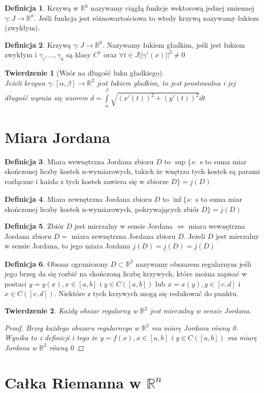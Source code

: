 \documentclass[12pt,a4paper]{article}
\newtheorem{tw}{Twierdzenie}
\theoremstyle{definition}
\newtheorem{df}{Definicja}
\begin{document}
\begin{df}
Krzywą w $\mathbb{R}^k$ nazywamy ciągłą funkcje wektorową jednej zmiennej $\gamma: J\to\mathbb{R}^k$. Jeśli funkcja jest różnowartościowa to wtedy krzywą nazywamy łukiem (zwykłym).
\end{df}
\begin{df}
Krzywą $\gamma: J\to\mathbb{R}^k$. Nazywamy łukiem gładkim, jeśli jest łukiem zwykłym i $\gamma_i, \dots ,\gamma_k$ są klasy $C^1$ oraz $\forall t\in J ||\gamma '(x)||^2 \neq 0$
\end{df}

\begin{tw}[Wzór na długość łuku gładkiego]~\\
Jeżeli krzywa $\gamma :[\alpha , \beta ] \to\mathbb{R}^2$ jest łukiem gładkim, to jest prostowalna i jej długość wyraża się wzorem $d = \int\limits_\alpha^\beta \sqrt{(x'(t))^2 + (y'(t))^2}dt$
\end{tw}

\section{Miara Jordana}
\begin{df}
Miara wewnętrzna Jordana zbioru $D$ to $\sup\{s:$ s to suma miar skończonej liczby kostek n-wymiarowych, takich że wnętrza tych kostek są parami rozłączne i każda z tych kostek zawiera się w zbiorze $D\} = \underline{j}(D)$
\end{df}
\begin{df}
Miara zewnętrzna Jordana zbioru $D$ to $\inf\{s:$ s to suma miar skończonej liczby kostek n-wymiarowych, pokrywających zbiór $ D\} = \overline{j}(D)$
\end{df}

\begin{df}
Zbiór $D$ jest mierzalny w sensie Jordana $\Leftrightarrow$ miara wewnętrzna Jordana zbioru $D = $ miara zewnętrzna Jordana zbioru $D$. 
Jeżeli $D$ jest mierzalny w sensie Jordana, to jego miara Jordana $j(D) = \underline{j}(D) = \overline{j}(D)$
\end{df}

\begin{df}
Obszar ograniczony $D\subset \mathbb{R}^2$ nazywamy obszarem regularnym jeśli jego brzeg da się rozbić na skończoną liczbę krzywych, które można zapisać w postaci $y=y(x), x\in [a,b]$ i $y\in C([a,b])$ lub $x=x(y), y\in [c,d]$ i $x\in C([c,d])$. Niektóre z tych krzywych mogą się redukować do punktu.
\end{df}
\begin{tw}
Każdy obszar regularny w $\mathbb{R}^2$ jest mierzalny w sensie Jordana.
\begin{proof}
Brzeg każdego obszaru regularnego w $\mathbb{R}^2$ ma miarę Jordana równą 0. Wynika to z definicji i tego że $y=f(x), x\in [a,b]$ i $y\in C([a,b])$ ma miarę Jordana w $\mathbb{R}^2$ równą $0$
\end{proof}
\end{tw}

\section{Całka Riemanna w $\mathbb{R}^n$}
\end{document}

